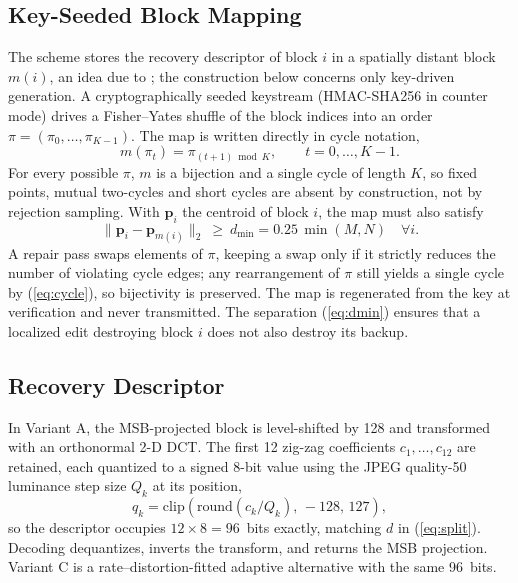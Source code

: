 \subsection{Key-Seeded Block Mapping}
\label{ssec:map}
The scheme stores the recovery descriptor of block $i$ in a spatially distant block $m(i)$, an idea due to \cite{ausr3}; the construction below concerns only key-driven generation. A cryptographically seeded keystream (HMAC-SHA256 in counter mode) drives a Fisher--Yates shuffle of the block indices into an order $\pi=(\pi_0,\dots,\pi_{K-1})$. The map is written directly in cycle notation,
\begin{equation}
m(\pi_t)=\pi_{(t+1)\bmod K},\qquad t=0,\dots,K-1.
\label{eq:cycle}
\end{equation}
For every possible $\pi$, $m$ is a bijection and a single cycle of length $K$, so fixed points, mutual two-cycles and short cycles are absent by construction, not by rejection sampling. With $\mathbf{p}_i$ the centroid of block $i$, the map must also satisfy
\begin{equation}
\lVert\mathbf{p}_i-\mathbf{p}_{m(i)}\rVert_2\ \ge\ d_{\min}=0.25\,\min(M,N)\quad\forall i.
\label{eq:dmin}
\end{equation}
A repair pass swaps elements of $\pi$, keeping a swap only if it strictly reduces the number of violating cycle edges; any rearrangement of $\pi$ still yields a single cycle by (\ref{eq:cycle}), so bijectivity is preserved. The map is regenerated from the key at verification and never transmitted. The separation (\ref{eq:dmin}) ensures that a localized edit destroying block $i$ does not also destroy its backup.

\subsection{Recovery Descriptor}
\label{ssec:desc}
In Variant A, the MSB-projected block is level-shifted by 128 and transformed with an orthonormal 2-D DCT. The first 12 zig-zag coefficients $c_1,\dots,c_{12}$ are retained, each quantized to a signed 8-bit value using the JPEG quality-50 luminance step size $Q_k$ at its position,
\begin{equation}
q_k=\mathrm{clip}\!\left(\mathrm{round}(c_k/Q_k),\,-128,\,127\right),
\label{eq:quant}
\end{equation}
so the descriptor occupies $12\times 8=96$~bits exactly, matching $d$ in (\ref{eq:split}). Decoding dequantizes, inverts the transform, and returns the MSB projection. Variant C is a rate--distortion-fitted adaptive alternative with the same 96~bits.

